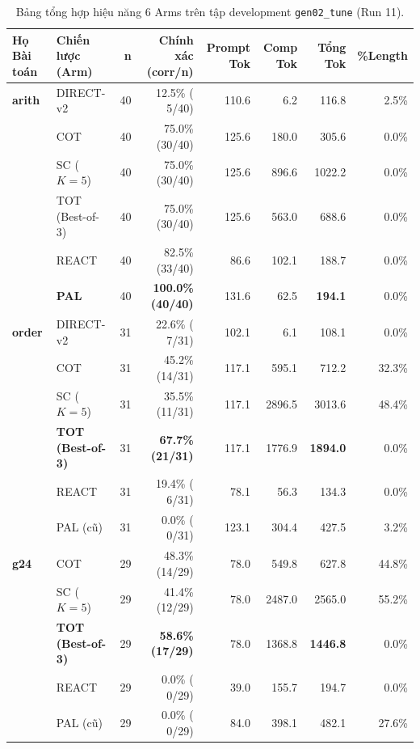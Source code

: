 \documentclass[11pt,a4paper]{report}
\begin{document}
\begin{table}[h!]
\centering\small
\begin{tabularx}{\textwidth}{llrrrrrr}
\toprule
\textbf{Họ Bài toán} & \textbf{Chiến lược (Arm)} & \textbf{n} & \textbf{Chính xác (corr/n)} & \textbf{Prompt Tok} & \textbf{Comp Tok} & \textbf{Tổng Tok} & \textbf{\%Length} \\
\midrule
\textbf{arith} & DIRECT-v2 & 40 & 12.5\% ( 5/40) & 110.6 & 6.2 & 116.8 & 2.5\% \\
& COT & 40 & 75.0\% (30/40) & 125.6 & 180.0 & 305.6 & 0.0\% \\
& SC ($K=5$) & 40 & 75.0\% (30/40) & 125.6 & 896.6 & 1022.2 & 0.0\% \\
& TOT (Best-of-3) & 40 & 75.0\% (30/40) & 125.6 & 563.0 & 688.6 & 0.0\% \\
& REACT & 40 & 82.5\% (33/40) & 86.6 & 102.1 & 188.7 & 0.0\% \\
& \textbf{PAL} & 40 & \textbf{100.0\% (40/40)} & 131.6 & 62.5 & \textbf{194.1} & 0.0\% \\
\midrule
\textbf{order} & DIRECT-v2 & 31 & 22.6\% ( 7/31) & 102.1 & 6.1 & 108.1 & 0.0\% \\
& COT & 31 & 45.2\% (14/31) & 117.1 & 595.1 & 712.2 & 32.3\% \\
& SC ($K=5$) & 31 & 35.5\% (11/31) & 117.1 & 2896.5 & 3013.6 & 48.4\% \\
& \textbf{TOT (Best-of-3)} & 31 & \textbf{67.7\% (21/31)} & 117.1 & 1776.9 & \textbf{1894.0} & 0.0\% \\
& REACT & 31 & 19.4\% ( 6/31) & 78.1 & 56.3 & 134.3 & 0.0\% \\
& PAL (cũ) & 31 & 0.0\% ( 0/31) & 123.1 & 304.4 & 427.5 & 3.2\% \\
\midrule
\textbf{g24} & COT & 29 & 48.3\% (14/29) & 78.0 & 549.8 & 627.8 & 44.8\% \\
& SC ($K=5$) & 29 & 41.4\% (12/29) & 78.0 & 2487.0 & 2565.0 & 55.2\% \\
& \textbf{TOT (Best-of-3)} & 29 & \textbf{58.6\% (17/29)} & 78.0 & 1368.8 & \textbf{1446.8} & 0.0\% \\
& REACT & 29 & 0.0\% ( 0/29) & 39.0 & 155.7 & 194.7 & 0.0\% \\
& PAL (cũ) & 29 & 0.0\% ( 0/29) & 84.0 & 398.1 & 482.1 & 27.6\% \\
\bottomrule
\end{tabularx}
\caption{Bảng tổng hợp hiệu năng 6 Arms trên tập development \texttt{gen02\_tune} (Run 11).}
\end{table}
\end{document}
